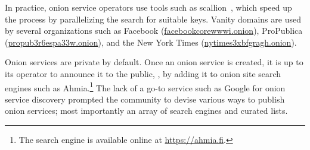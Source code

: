 In practice, onion service operators use tools such as scallion~\cite{scallion},
which speed up the process by parallelizing the search for suitable keys.
Vanity domains are used by several organizations such as Facebook
(\url{facebookcorewwwi.onion}), ProPublica (\url{propub3r6espa33w.onion}), and
the New York Times (\url{nytimes3xbfgragh.onion}).

Onion services are private by default.  Once an onion service is created, it is
up to its operator to announce it to the public, \eg, by adding it to onion site
search engines such as Ahmia.\footnote{The search engine is available online at
\url{https://ahmia.fi}.}  The lack of a go-to service such as Google for onion
service discovery prompted the community to devise various ways to publish onion
services; most importantly an array of search engines and curated lists.
